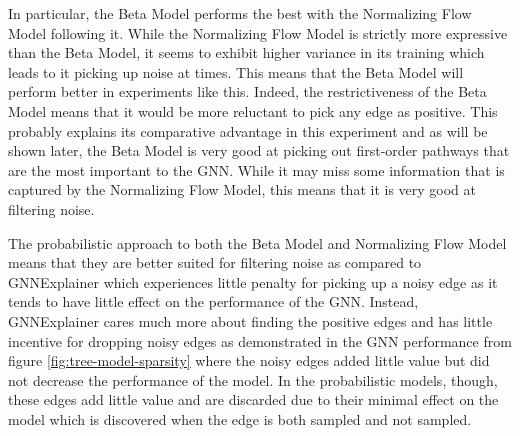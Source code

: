 In particular, the Beta Model performs the best with the Normalizing Flow Model following it. While the Normalizing Flow Model is strictly more expressive than the Beta Model, it seems to exhibit higher variance in its training which leads to it picking up noise at times. This means that the Beta Model will perform better in experiments like this. Indeed, the restrictiveness of the Beta Model means that it would be more reluctant to pick any edge as positive. This probably explains its comparative advantage in this experiment and as will be shown later, the Beta Model is very good at picking out first-order pathways that are the most important to the GNN. While it may miss some information that is captured by the Normalizing Flow Model, this means that it is very good at filtering noise. 

The probabilistic approach to both the Beta Model and Normalizing Flow Model means that they are better suited for filtering noise as compared to GNNExplainer which experiences little penalty for picking up a noisy edge as it tends to have little effect on the performance of the GNN. Instead, GNNExplainer cares much more about finding the positive edges and has little incentive for dropping noisy edges as demonstrated in the GNN performance from figure \ref{fig:tree-model-sparsity} where the noisy edges added little value but did not decrease the performance of the model. In the probabilistic models, though, these edges add little value and are discarded due to their minimal effect on the model which is discovered when the edge is both sampled and not sampled. 

